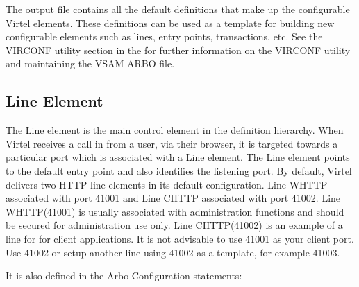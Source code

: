 \documentclass[letterpaper,10pt,english]{sphinxmanual}
\begin{document}
\sphinxAtStartPar
{}

\sphinxAtStartPar
The output file contains all the default definitions that make up the configurable Virtel elements. These definitions can be used as a template for building new configurable elements such as lines, entry points, transactions, etc. See the VIRCONF utility section in the  for further information on the VIRCONF utility and maintaining the VSAM ARBO file.

\newpage


\subsection{Line Element}
\label{\detokenize{connectivity_guide:line-element}}
\sphinxAtStartPar
The Line element is the main control element in the definition hierarchy. When Virtel receives a call in from a user, via their browser, it is targeted towards a particular port which is associated with a Line element.  The Line element points to the default entry point and also identifies the listening port. By default, Virtel delivers two HTTP line elements in its default configuration. Line W\sphinxhyphen{}HTTP associated with port 41001 and Line C\sphinxhyphen{}HTTP associated with port 41002. Line W\sphinxhyphen{}HTTP(41001) is usually associated with administration functions and should be secured for administration use only. Line C\sphinxhyphen{}HTTP(41002) is an example of a line for for client applications. It is not advisable to use 41001 as your client port. Use 41002 or set\sphinxhyphen{}up another line using 41002 as a template, for example 41003.

\sphinxAtStartPar
{}

\sphinxAtStartPar
It is also defined in the Arbo Configuration statements:\sphinxhyphen{}
\end{document}
